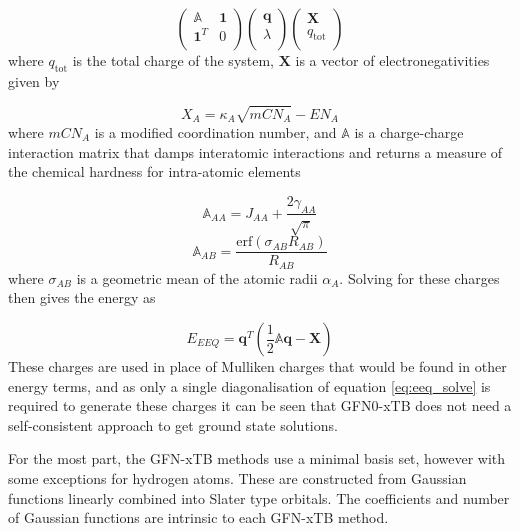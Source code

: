 \begin{equation}
    \label{eq:eeq_solve}
    \begin{pmatrix}
        \mathbb{A} & \mathbf{1} \\
        \mathbf{1}^T & 0 \\
    \end{pmatrix}
    \begin{pmatrix}
        \mathbf{q} \\
        \lambda \\
    \end{pmatrix}
    \begin{pmatrix}
        \mathbf{X} \\
        q_\text{tot} \\
    \end{pmatrix}
\end{equation}
%
where $q_\text{tot}$ is the total charge of the system, $\mathbf{X}$ is a vector of 
electronegativities given by

\begin{equation}
    X_A = \kappa_A \sqrt{mCN_A} - EN_A
\end{equation}
%
where $mCN_A$ is a modified coordination number, and $\mathbb{A}$ is a charge-charge
interaction matrix that damps interatomic interactions and returns a measure of 
the chemical hardness for intra-atomic elements

\begin{equation}
    \mathbb{A}_{AA} = J_{AA} + \frac{2\gamma_{AA}}{\sqrt{\pi}}
\end{equation}
%
\begin{equation}
    \mathbb{A}_{AB} = \frac{\text{erf}\left(\sigma_{AB} R_{AB}\right)}{R_{AB}}
\end{equation}
%
where $\sigma_{AB}$ is a geometric mean of the atomic radii $\alpha_A$. Solving 
for these charges then gives the energy as 

\begin{equation}
    E_{EEQ} = \mathbf{q}^T \left(\frac{1}{2}\mathbb{A}\mathbf{q} - \mathbf{X}\right)
\end{equation}
%
These charges are used in place of Mulliken charges that would be found in other
energy terms, and as only a single diagonalisation of equation \ref{eq:eeq_solve} 
is required to generate these charges it can be seen that GFN0-xTB does not need
a self-consistent approach to get ground state solutions.

For the most part, the GFN-xTB methods use a minimal basis set, however with some
exceptions for hydrogen atoms. These are constructed from Gaussian functions linearly
combined into Slater type orbitals. The coefficients and number of Gaussian functions
are intrinsic to each GFN-xTB method.

